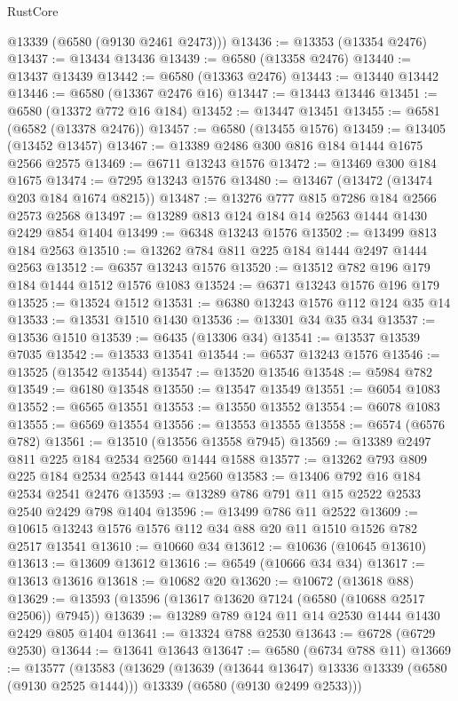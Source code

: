 \begin{lexlean}{RustCore}
\begin{coremodule}
{\begin{coremodule}
{{{{{{{{{{{{{{{{{{{{{{{{{{{{{{{{{{{{{{{{{{{{{      @13339
      (@6580 (@9130 @2461 @2473)))
@13436 := @13353 (@13354 @2476)
@13437 := @13434 @13436
@13439 := @6580 (@13358 @2476)
@13440 := @13437 @13439
@13442 := @6580 (@13363 @2476)
@13443 := @13440 @13442
@13446 := @6580 (@13367 @2476 @16)
@13447 := @13443 @13446
@13451 := @6580 (@13372 @772 @16 @184)
@13452 := @13447 @13451
@13455 := @6581 (@6582 (@13378 @2476))
@13457 := @6580 (@13455 @1576)
@13459 := @13405 (@13452 @13457)
@13467 := @13389 @2486 @300 @816 @184 @1444 @1675 @2566 @2575
@13469 := @6711 @13243 @1576
@13472 := @13469 @300 @184 @1675
@13474 := @7295 @13243 @1576
@13480 := @13467 (@13472 (@13474 @203 @184 @1674 @8215))
@13487 := @13276 @777 @815 @7286 @184 @2566 @2573 @2568
@13497 := @13289 @813 @124 @184 @14 @2563 @1444 @1430 @2429 @854 @1404
@13499 := @6348 @13243 @1576
@13502 := @13499 @813 @184 @2563
@13510 := @13262 @784 @811 @225 @184 @1444 @2497 @1444 @2563
@13512 := @6357 @13243 @1576
@13520 := @13512 @782 @196 @179 @184 @1444 @1512 @1576 @1083
@13524 := @6371 @13243 @1576 @196 @179
@13525 := @13524 @1512
@13531 := @6380 @13243 @1576 @112 @124 @35 @14
@13533 := @13531 @1510 @1430
@13536 := @13301 @34 @35 @34
@13537 := @13536 @1510
@13539 := @6435 (@13306 @34)
@13541 := @13537 @13539 @7035
@13542 := @13533 @13541
@13544 := @6537 @13243 @1576
@13546 := @13525 (@13542 @13544)
@13547 := @13520 @13546
@13548 := @5984 @782
@13549 := @6180 @13548
@13550 := @13547 @13549
@13551 := @6054 @1083
@13552 := @6565 @13551
@13553 := @13550 @13552
@13554 := @6078 @1083
@13555 := @6569 @13554
@13556 := @13553 @13555
@13558 := @6574 (@6576 @782)
@13561 := @13510 (@13556 @13558 @7945)
@13569 := @13389 @2497 @811 @225 @184 @2534 @2560 @1444 @1588
@13577 := @13262 @793 @809 @225 @184 @2534 @2543 @1444 @2560
@13583 := @13406 @792 @16 @184 @2534 @2541 @2476
@13593 := @13289 @786 @791 @11 @15 @2522 @2533 @2540 @2429 @798 @1404
@13596 := @13499 @786 @11 @2522
@13609 := @10615 @13243 @1576 @1576 @112 @34 @88 @20 @11 @1510 @1526 @782 @2517 @13541
@13610 := @10660 @34
@13612 := @10636 (@10645 @13610)
@13613 := @13609 @13612
@13616 := @6549 (@10666 @34 @34)
@13617 := @13613 @13616
@13618 := @10682 @20
@13620 := @10672 (@13618 @88)
@13629 := @13593 (@13596 (@13617 @13620 @7124 (@6580 (@10688 @2517 @2506)) @7945))
@13639 := @13289 @789 @124 @11 @14 @2530 @1444 @1430 @2429 @805 @1404
@13641 := @13324 @788 @2530
@13643 := @6728 (@6729 @2530)
@13644 := @13641 @13643
@13647 := @6580 (@6734 @788 @11)
@13669 := @13577
    (@13583
      (@13629
        (@13639 (@13644 @13647) @13336 @13339 (@6580 (@9130 @2525 @1444)))
        @13339
        (@6580 (@9130 @2499 @2533)))
}}}}}}}}}}}}}}}}}}}}}}}}}}}}}}}}}}}}}}}}}}}}}
\end{coremodule}}
\end{coremodule}
\end{lexlean}
